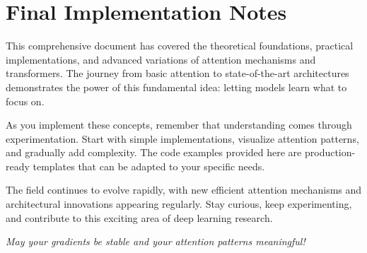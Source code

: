 
\section{Final Implementation Notes}

This comprehensive document has covered the theoretical foundations, practical implementations, and advanced variations of attention mechanisms and transformers. The journey from basic attention to state-of-the-art architectures demonstrates the power of this fundamental idea: letting models learn what to focus on.

As you implement these concepts, remember that understanding comes through experimentation. Start with simple implementations, visualize attention patterns, and gradually add complexity. The code examples provided here are production-ready templates that can be adapted to your specific needs.

The field continues to evolve rapidly, with new efficient attention mechanisms and architectural innovations appearing regularly. Stay curious, keep experimenting, and contribute to this exciting area of deep learning research.

\textit{May your gradients be stable and your attention patterns meaningful!}

